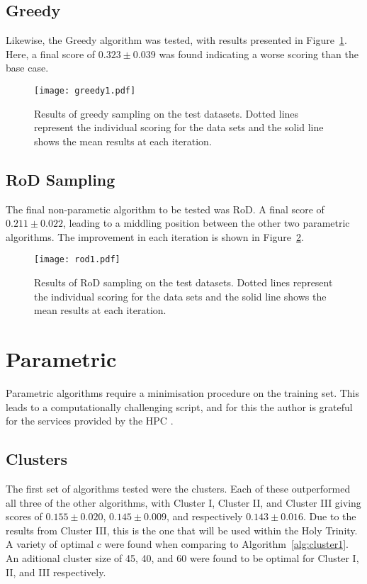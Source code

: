 \subsection{Greedy}
Likewise, the Greedy algorithm was tested, with results presented in Figure~\ref{fig:GreedyTestSet}. Here, a final score of ${0.323\pm{}0.039}$ was found indicating a worse scoring than the base case.
\begin{figure}[H]
    \begin{center}
        \texttt{[image: greedy1.pdf]}
        \caption[Greedy]{Results of greedy sampling on the test datasets. Dotted lines represent the individual scoring for the data sets and the solid line shows the mean results at each iteration.}
        \label{fig:GreedyTestSet}
    \end{center}
\end{figure}

\subsection{RoD Sampling}
The final non-parametic algorithm to be tested was RoD. A final score of ${0.211\pm{}0.022}$, leading to a middling position between the other two parametric algorithms. The improvement in each iteration is shown in Figure~\ref{fig:RODTestSet}.

\begin{figure}[H]
    \begin{center}
        \texttt{[image: rod1.pdf]}
        \caption[RoD]{Results of RoD sampling on the test datasets. Dotted lines represent the individual scoring for the data sets and the solid line shows the mean results at each iteration.}
        \label{fig:RODTestSet}
    \end{center}
\end{figure}

\section{Parametric}
Parametric algorithms require a minimisation procedure on the training set. This leads to a computationally challenging script, and for this the author is grateful for the services provided by the HPC \cite{HPC}.

\subsection{Clusters}
The first set of algorithms tested were the clusters. Each of these outperformed all three of the other algorithms, with Cluster I, Cluster II, and Cluster III giving scores of ${0.155\pm{}0.020}$, ${0.145\pm{}0.009}$, and respectively ${0.143\pm{}0.016}$. Due to the results from Cluster III, this is the one that will be used within the Holy Trinity. A variety of optimal ${c}$ were found when comparing to Algorithm~\ref{alg:cluster1}. An aditional cluster size of 45, 40, and 60 were found to be optimal for Cluster I, II, and III respectively.

